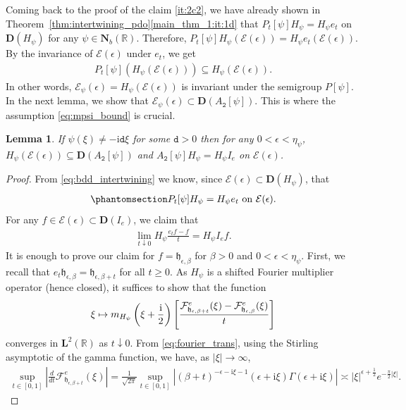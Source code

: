 \documentclass[12pt]{amsart}
\newcommand{\hlabel}{\phantomsection\label}
\numberwithin{equation}{section}
\newcommand{\bb}{\mathbb}
\newcommand{\cc}{\mathcal}
\renewcommand{\ge}{\geqslant}
\newcommand{\mf}{\mathfrak}
\newcommand{\ttt}{\mathtt}
\newcommand{\bmrm}[2][2]{\mathbf{#2}^{#1}}
\newcommand{\Hpsi}{H_\psi}
\newcommand{\fouho}{\cc{F}^{e}}
\newcommand{\D}{\mathbf{D}}
\newcommand{\eps}{\epsilon}
\newcommand{\heb}{\mf{h}_{\eps,\beta}}
\renewcommand{\i}{\mathrm{i}}
\newtheorem{lem}[thm]{Lemma}
\theoremstyle{definition}
\theoremstyle{assump}
\theoremstyle{remark}
\begin{document}
{Coming back to the proof of the claim \eqref{it:2c2}, we have already shown in Theorem~\ref{thm:intertwining_pdo}\eqref{main_thm_1:it:1d} that $P_t[\psi]\Hpsi=\Hpsi e_t$ on $\D(H_\psi)$ for any $\psi\in\mathbf{N}_b(\bb{R})$. Therefore, $P_t[\psi]\Hpsi(\cc{E}(\eps))=\Hpsi e_t(\cc{E}(\eps))$. By the invariance of $\cc{E}(\eps)$ under $e_t$, we get
\begin{align*}
P_t[\psi](\Hpsi(\cc{E}(\eps)))\subseteq\Hpsi(\cc{E}(\eps)).
\end{align*}
In other words, $\cc{E}_\psi(\eps)=\Hpsi(\cc{E}(\eps))$ is invariant under the semigroup $P[\psi]$. In the next lemma, we show that $\cc{E}_\psi(\eps)\subset\D(A_\ttt{2}[\psi])$. This is where the assumption \eqref{eq:mpsi_bound} is crucial.
\begin{lem}\hlabel{lem:gen_int_2}
If $\psi(\xi)\neq -\i\ttt{d}\xi$ for some $\ttt{d}>0$ then for any $0<\eps<\eta_\psi$, $\Hpsi (\cc{E}(\eps))\subseteq \D(A_\ttt{2}[\psi])$ and $A_\ttt{2}[\psi]\Hpsi =\Hpsi I_{e}$ on $\cc{E}(\eps)$.%
\end{lem}
\begin{proof}
From \eqref{eq:bdd_intertwining} we know, since  $\cc{E}(\eps)\subset \D(\Hpsi)$, that
\begin{align}\hlabel{eq:random}
P_t[\psi]\Hpsi =\Hpsi e_t  \mbox{ on } \cc{E}(\eps).
\end{align}
For any $f\in\cc{E}(\eps)\subset\D(I_e)$, we claim that
 \begin{align*}
 \lim_{t\downarrow 0}\Hpsi\frac{e_t f-f}{t}=\Hpsi I_{e}f.
 \end{align*}
It is enough to prove our claim for $f=\heb$ for $\beta>0$ and $0<\eps<\eta_\psi$. First, we recall that $e_t\heb=\mathfrak{h}_{\eps,\beta+t}$ for all $t\ge 0$. As $\Hpsi$ is a shifted Fourier multiplier operator (hence closed), it suffices to show that the function
 \[\xi\mapsto m_{\Hpsi}\left(\xi+\frac{{\rm{i}}}{2}\right)\left[\frac{\fouho_{\mathfrak{h}_{\eps,\beta+t}}(\xi)-\fouho_{\heb}(\xi)}{t}\right]\]
 converges in $\bmrm{L}(\bb{R})$ as $t \downarrow 0$. From \eqref{eq:fourier_trans}, using the Stirling asymptotic of the gamma function, we have, as $|\xi|\to\infty$,
 \begin{equation*}
 \begin{aligned}
 \sup_{t\in [0,1]}\left|\frac{d}{dt}\fouho_{\mathfrak{h}_{\eps,\beta+t}}(\xi)\right|
 =\frac{1}{\sqrt{2\pi}}\sup_{t\in [0,1]}\left|(\beta+t)^{-\eps-\i\xi-1} (\eps+\i\xi)\Gamma(\eps+\i\xi) \right|\asymp  |\xi|^{\eps+\frac{1}{2}} e^{-\frac{\pi}{2}|\xi|}.
\end{aligned}

\end{equation*}
\end{proof}}
\end{document}
